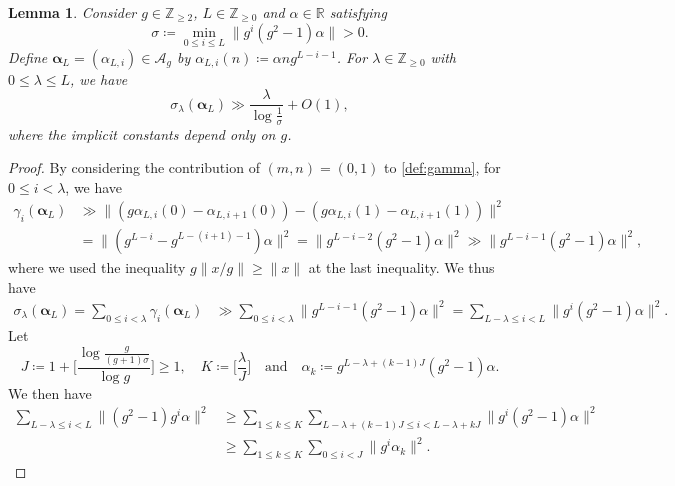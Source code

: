 \documentclass[hidelinks]{amsart}
\numberwithin{equation}{section}
\theoremstyle{plain}
\newtheorem{lemma}{Lemma}
\theoremstyle{definition}
\renewcommand{\and}{\quad\text{and}\quad}
\begin{document}
\begin{lemma}
\label{lem:reverse:sigma_lower}
Consider $g\in\mathbb{Z}_{\ge2}$, $L\in\mathbb{Z}_{\ge0}$ and $\alpha\in\mathbb{R}$ satisfying
\begin{equation}
\label{lem:reverse:sigma_lower:alpha_cond}
\sigma
\coloneqq
\min_{0\le i\le L}\|g^{i}(g^{2}-1)\alpha\|
>0.
\end{equation}
Define $\bm{\alpha}_{L}=(\alpha_{L,i})\in\mathscr{A}_{g}$ by
$\alpha_{L,i}(n)\coloneqq\alpha ng^{L-i-1}$.
For $\lambda\in\mathbb{Z}_{\ge0}$ with $0\le\lambda\le L$,
we have
\[
\sigma_{\lambda}(\bm{\alpha}_{L})
\gg
\frac{\lambda}{\log\frac{1}{\sigma}}+O(1),
\]
where the implicit constants depend only on $g$.
\end{lemma}
\begin{proof}
By considering the contribution of $(m,n)=(0,1)$ to \cref{def:gamma},
for $0\le i<\lambda$, we have
\begin{align}
\gamma_{i}(\bm{\alpha}_{L})
&\gg
\|(g\alpha_{L,i}(0)-\alpha_{L,i+1}(0))
-
(g\alpha_{L,i}(1)-\alpha_{L,i+1}(1))\|^{2}\\
&=
\|(g^{L-i}-g^{L-(i+1)-1})\alpha\|^{2}
=
\|g^{L-i-2}(g^{2}-1)\alpha\|^{2}
\gg
\|g^{L-i-1}(g^{2}-1)\alpha\|^{2},
\end{align}
where we used the inequality $g\|x/g\|\ge\|x\|$ at the last inequality.
We thus have
\begin{equation}
\label{lem:reverse:sigma_lower:sigma_to_sum}
\begin{aligned}
\sigma_{\lambda}(\bm{\alpha}_{L})
=
\sum_{0\le i<\lambda}\gamma_{i}(\bm{\alpha}_{L})
&\gg
\sum_{0\le i<\lambda}
\|g^{L-i-1}(g^{2}-1)\alpha\|^{2}
=
\sum_{L-\lambda\le i<L}
\|g^{i}(g^{2}-1)\alpha\|^{2}.
\end{aligned}
\end{equation}
Let
\[
J
\coloneqq
1+\biggl[\frac{\log\frac{g}{(g+1)\sigma}}{\log g}\biggr]\ge1,\quad
K
\coloneqq
\biggl[\frac{\lambda}{J}\biggr]
\and
\alpha_{k}
\coloneqq
g^{L-\lambda+(k-1)J}(g^{2}-1)\alpha.
\]
We then have
\begin{equation}
\label{lem:reverse:sigma_lower:inner_sum}
\begin{aligned}
\sum_{L-\lambda\le i<L}
\|(g^{2}-1)g^{i}\alpha\|^{2}
&\ge
\sum_{1\le k\le K}
\sum_{L-\lambda+(k-1)J\le i<L-\lambda+kJ}
\|g^{i}(g^{2}-1)\alpha\|^{2}\\
&\ge
\sum_{1\le k\le K}
\sum_{0\le i<J}
\|g^{i}\alpha_{k}\|^{2}.
\end{aligned}

\end{equation}
\end{proof}
\end{document}
